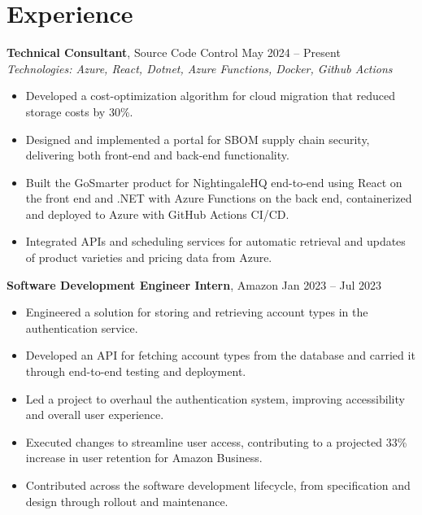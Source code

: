 \documentclass[11pt,a4paper]{article}
\begin{document}
\section{Experience}
\textbf{Technical Consultant}, Source Code Control \hfill May 2024 -- Present
\\ \textit{Technologies: Azure, React, Dotnet, Azure Functions, Docker, Github Actions}
\begin{itemize}
  \item Developed a cost-optimization algorithm for cloud migration that reduced storage costs by 30\%.
  \item Designed and implemented a portal for SBOM supply chain security, delivering both front-end and back-end functionality.
  \item Built the GoSmarter product for NightingaleHQ end-to-end using React on the front end and .NET with Azure Functions on the back end, containerized and deployed to Azure with GitHub Actions CI/CD.
  \item Integrated APIs and scheduling services for automatic retrieval and updates of product varieties and pricing data from Azure.
\end{itemize}
\vspace{2pt}
\textbf{Software Development Engineer Intern}, Amazon \hfill Jan 2023 -- Jul 2023
\begin{itemize}
  \item Engineered a solution for storing and retrieving account types in the authentication service.
  \item Developed an API for fetching account types from the database and carried it through end-to-end testing and deployment.
  \item Led a project to overhaul the authentication system, improving accessibility and overall user experience.
  \item Executed changes to streamline user access, contributing to a projected 33\% increase in user retention for Amazon Business.
  \item Contributed across the software development lifecycle, from specification and design through rollout and maintenance.
\end{itemize}
\vspace{2pt}
\end{document}
